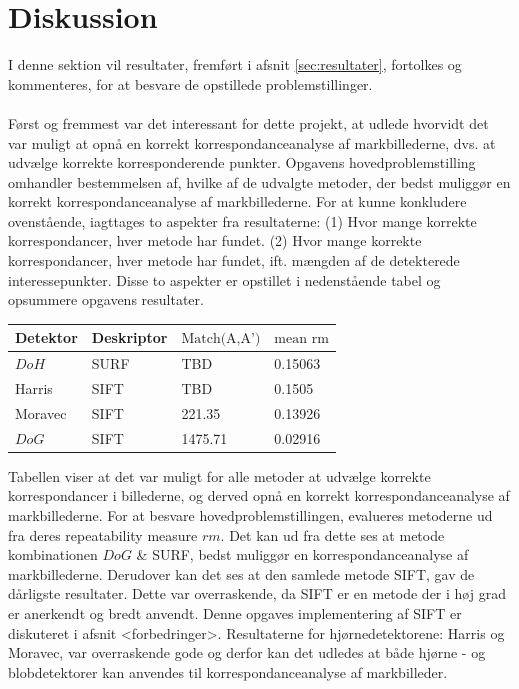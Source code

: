\chapter{Diskussion}
I denne sektion vil resultater, fremført i afsnit \ref{sec:resultater}, fortolkes og kommenteres, for at besvare de opstillede problemstillinger. \\ \\
Først og fremmest var det interessant for dette projekt, at udlede hvorvidt det var muligt at opnå en korrekt korrespondanceanalyse af markbillederne, dvs. at udvælge korrekte korresponderende punkter. Opgavens hovedproblemstilling omhandler bestemmelsen af, hvilke af de udvalgte metoder, der bedst muliggør en korrekt korrespondanceanalyse af markbillederne. For at kunne konkludere ovenstående, iagttages to aspekter fra resultaterne: (1) Hvor mange korrekte korrespondancer, hver metode har fundet. (2) Hvor mange korrekte korrespondancer, hver metode har fundet, ift. mængden af de detekterede interessepunkter. Disse to aspekter er opstillet i nedenstående tabel og opsummere opgavens resultater.
\begin{center}
    \begin{tabular}{ | l | l | l | l |}
    \hline
    Detektor & Deskriptor & $\text{Match(A,A')}$ & $\text{mean rm}$ \\ \hline
    $DoH$ & SURF & TBD & 0.15063 \\ \hline  
    Harris & SIFT & TBD & 0.1505 \\ \hline    
    Moravec & SIFT & 221.35 & 0.13926 \\ \hline    
    $DoG$ & SIFT & 1475.71 & 0.02916 \\ \hline         
    \end{tabular}
    \label{table:tab}
\end{center}
Tabellen viser at det var muligt for alle metoder at udvælge korrekte korrespondancer i billederne, og derved opnå en korrekt korrespondanceanalyse af markbillederne. For at besvare hovedproblemstillingen, evalueres metoderne ud fra deres repeatability measure $rm$. Det kan ud fra dette ses at metode kombinationen $DoG$ \& SURF, bedst muliggør en korrespondanceanalyse af markbillederne. Derudover kan det ses at den samlede metode SIFT, gav de dårligste resultater. Dette var overraskende, da SIFT er en metode der i høj grad er anerkendt og bredt anvendt. Denne opgaves implementering af SIFT er diskuteret i afsnit <forbedringer>. Resultaterne for hjørnedetektorene: Harris og Moravec, var overraskende gode og derfor kan det udledes at både hjørne - og blobdetektorer kan anvendes til korrespondanceanalyse af markbilleder.
